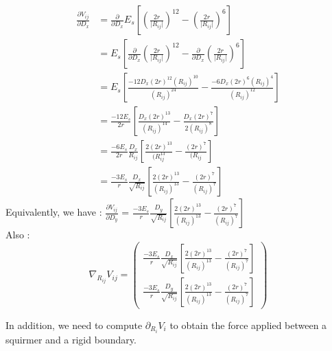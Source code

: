 \documentclass{article}
\begin{document}
\begin{align*}
\frac{\partial V_{ij}}{\partial D_x} &= \frac{\partial}{\partial D_x}E_s\left[\left(\frac{2r}{\lvert R_{ij}\rvert}\right)^{12} - \left(\frac{2r}{\lvert R_{ij}\rvert}\right)^6\right] \\
&= E_s \left[\frac{\partial}{\partial D_x}\left(\frac{2r}{\lvert R_{ij}\rvert}\right)^{12} - \frac{\partial}{\partial D_x} \left(\frac{2r}{\lvert R_{ij}\rvert}\right)^6\right] \\
&= E_s \left[ \frac{-12 D_x (2r)^{12}(R_{ij})^{10}}{(R_{ij})^{24}} - \frac{-6D_x(2r)^6(R_{ij})^4}{(R_{ij})^12}  \right] \\
&= \frac{-12 E_s}{2r} \left[ \frac{D_x (2r)^{13}}{(R_{ij})^{14}} - \frac{D_x (2r)^{7}}{2(R_{ij})^8}\right] \\
&= \frac{-6 E_s}{2r} \frac{D_x}{R_{ij}} \left[ \frac{2(2r)^{13}}{(R_{ij}^13} - \frac{(2r)^7}{(R_{ij}}\right] \\
&= \frac{-3 E_s}{r} \frac{D_x}{\sqrt{R_{ij}}}\left[ \frac{2(2r)^{13}}{(R_{ij})^13} - \frac{(2r)^7}{(R_{ij})^7} \right]
\end{align*}
Equivalently, we have : 
$\frac{\partial V_{ij}}{\partial D_y}$ = $\frac{-3 E_s}{r} \frac{D_y}{\sqrt{R_{ij}}}\left[ \frac{2(2r)^{13}}{(R_{ij})^13} - \frac{(2r)^7}{(R_{ij})^7} \right]$
\\ Also : 
\begin{equation*}
    \boxed{\nabla_{R_{ij}} V_{ij} = 
    \begin{pmatrix}
        \frac{-3 E_s}{r} \frac{D_x}{\sqrt{R_{ij}}}\left[ \frac{2(2r)^{13}}{(R_{ij})^{13}} - \frac{(2r)^7}{(R_{ij})^7} \right] \\
        \frac{-3 E_s}{r} \frac{D_y}{\sqrt{R_{ij}}}\left[ \frac{2(2r)^{13}}{(R_{ij})^{13}} - \frac{(2r)^7}{(R_{ij})^7} \right]
    \end{pmatrix}}
\end{equation*}

\vspace{0,5cm}

In addition, we need to compute $\partial_{R_i} V_i$ to obtain the force applied between a squirmer and a rigid boundary.
\end{document}
